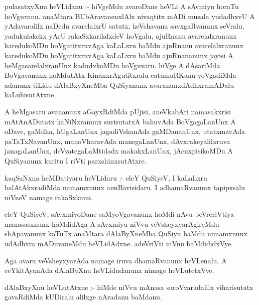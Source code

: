 \documentclass{article}
\begin{document}
\begin{mn}
pulasatxyXnu  heVLidanu :- hiVgeMdu  avaroDane  heVLi  A  sAvmiyu  horaTu  hoVguvanu.  
anaMtara  BUbAravanenxlAlx  nivaqtitx  mADi  musala  yudadhxvU  A  yAdavaralilx  naDedu  
avarelalxrU  satutx,  keVshavanu  savxgaRvanunx  seVralu,  yadukulakekx  yArU  
rakaSxkarilalxdeV  hoVgalu,  ajuRnanu  avarelalxranunx  karedukoMDu  hoVgutitxruvAga  
kaLaLxru  baMdu  ajuRnanu  avarelalxranunx  karedukoMDu  hoVgutitxruvAga  kaLaLxru  baMdu  
ajuRnananunx  jayisi  A  heMgasarelalxranUnx  kadudxkoMDu  hoVguvaru.  hiVge  A  dAsariMda  
BoVgavanunx  hoMdutAtx  KinanxrAgutitxralu  catumuRKanu  yoVgadiMda  adanunx  tiLidu  
dAlaBxyXneMba  QuSiyanunx  avaranunxdAdhxramADalu  kaLuhisutAtxne.                                                                                                                  
\end{mn}

\begin{mn}
A  heMgasaru  avananunx  aGayxRdiMda  pUjisi,  aneVkabAri  namasakxrisi  mAtAnADutatx  
kaNiNxranunx  surisutatxA  bahuvAda  BoVgagaLanUnx  A  oDave,  gaMdha,  hUgaLanUnx  
jagadiVshanAda  gaMDananUnx,  utatxmavAda  paTaTxNavanUnx,  manoVharavAda  manegaLanUnx,  
dAvxrakeyalilxruva  janagaLanUnx,  deVvategaLaMtidadx  makakxLanUnx,  jAcnxpisikoMDu  
A  QuSiyanunx  kuritu  I riVti  parxshinxsutAtxre.
\end{mn}

\begin{mn}
kaqSaNxna  heMDatiyaru  heVLidaru :- eleY  QuSiyeV,  I  kaLaLxru  balAtAkxradiMda  
namamxnunx  anuBavisidaru.  I  adhamaRvanunx  tapipxsalu  niVneV  namage  rakaSxkanu.
\end{mn}

\begin{mn}
eleY  QuSiyeV,  sAvxmiyoDane  saMyoVgavanunx  hoMdi  nAvu  beVreriVtiya  manasasxnunx  hoMdidAga  
A  sAvxmiyu  niVvu  veVsheyxyarAgireMdu  shApavanunx  koTuTx  anaMtara  dAlaByXneMba  QuSiyu  
baMdu  nimamxnunx  udAdhxra  mADuvaneMdu  heVLidAdxne.  adeVriVti  niVnu  baMdididxVye.
\end{mn}

\begin{mn}
Aga  avaru  veVsheyxyarAda  namage  iruva  dhamaRvanunx  heVLenalu,  A  ceYkitAyanAda  
dAlaByXnu  heVLidudanunx  nimage  heVLutetxVve.
\end{mn}

\begin{mn}
dAlaBxyXnu  heVLutAtxne :- hiMde  niVvu  mAnasa  saroVvaradalilx  viharisutatx  gavaRdiMda  
kUDiralu  alilxge  nAradanu  baMdanu.
\end{mn}
\end{document}
